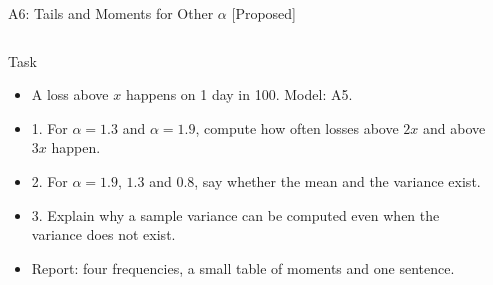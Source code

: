 \begin{frame}{A6: Tails and Moments for Other $\alpha$ [Proposed]}
\propsub
\itemsize{\footnotesize}
\begin{columns}[T]
\begin{column}{\taskw}
\begin{block}{Task}
\begin{itemize}
    \item A loss above $x$ happens on 1 day in 100. Model: A5.
    \item 1. For $\alpha = 1.3$ and $\alpha = 1.9$, compute how often losses above $2x$ and above $3x$ happen.
    \item 2. For $\alpha = 1.9$, $1.3$ and $0.8$, say whether the mean and the variance exist.
    \item 3. Explain why a sample variance can be computed even when the variance does not exist.
    \item Report: four frequencies, a small table of moments and one sentence.
\end{itemize}
\end{block}
\end{column}
\begin{column}{\solw}
\end{column}
\end{columns}
\end{frame}

